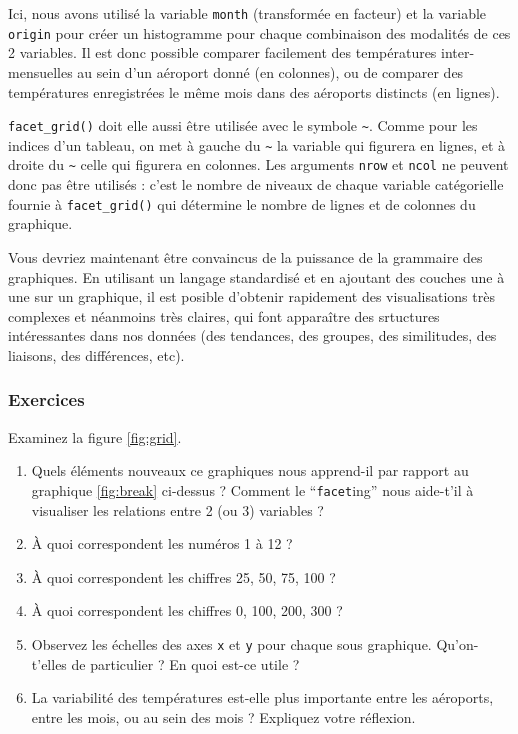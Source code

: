 \documentclass[a4paperpaper,]{article}
\providecommand{\tightlist}{%
  \setlength{\itemsep}{0pt}\setlength{\parskip}{0pt}}
\theoremstyle{definition}
\theoremstyle{definition}
\theoremstyle{definition}
\theoremstyle{remark}
\begin{document}
Ici, nous avons utilisé la variable \texttt{month} (transformée en
facteur) et la variable \texttt{origin} pour créer un histogramme pour
chaque combinaison des modalités de ces 2 variables. Il est donc
possible comparer facilement des températures inter-mensuelles au sein
d'un aéroport donné (en colonnes), ou de comparer des températures
enregistrées le même mois dans des aéroports distincts (en lignes).

\texttt{facet\_grid()} doit elle aussi être utilisée avec le symbole
\texttt{\textasciitilde{}}. Comme pour les indices d'un tableau, on met
à gauche du \texttt{\textasciitilde{}} la variable qui figurera en
lignes, et à droite du \texttt{\textasciitilde{}} celle qui figurera en
colonnes. Les arguments \texttt{nrow} et \texttt{ncol} ne peuvent donc
pas être utilisés : c'est le nombre de niveaux de chaque variable
catégorielle fournie à \texttt{facet\_grid()} qui détermine le nombre de
lignes et de colonnes du graphique.

Vous devriez maintenant être convaincus de la puissance de la grammaire
des graphiques. En utilisant un langage standardisé et en ajoutant des
couches une à une sur un graphique, il est posible d'obtenir rapidement
des visualisations très complexes et néanmoins très claires, qui font
apparaître des srtuctures intéressantes dans nos données (des tendances,
des groupes, des similitudes, des liaisons, des différences, etc).

\subsubsection{Exercices}\label{exercices-4}

Examinez la figure \ref{fig:grid}.

\begin{enumerate}
\def\labelenumi{\arabic{enumi}.}
\tightlist
\item
  Quels éléments nouveaux ce graphiques nous apprend-il par rapport au
  graphique \ref{fig:break} ci-dessus ? Comment le ``\texttt{facet}ing''
  nous aide-t'il à visualiser les relations entre 2 (ou 3) variables ?
\item
  À quoi correspondent les numéros 1 à 12 ?
\item
  À quoi correspondent les chiffres 25, 50, 75, 100 ?
\item
  À quoi correspondent les chiffres 0, 100, 200, 300 ?
\item
  Observez les échelles des axes \texttt{x} et \texttt{y} pour chaque
  sous graphique. Qu'on-t'elles de particulier ? En quoi est-ce utile ?
\item
  La variabilité des températures est-elle plus importante entre les
  aéroports, entre les mois, ou au sein des mois ? Expliquez votre
  réflexion.
\end{enumerate}
\end{document}
